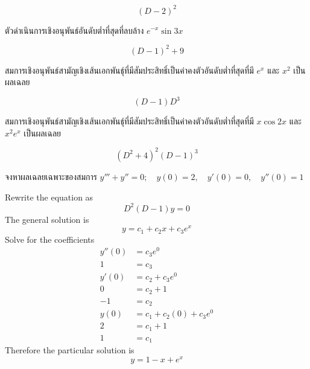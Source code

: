 \documentclass[12pt,final]{novelette} %
\begin{document}
\begin{question}[resume]
\begin{question}
        $$ \boxed{(D-2)^2} $$

        \item
        ตัวดําเนินการเชิงอนุพันธ์อันดับต่ำที่สุดที่ลบล้าง $e^{-x}\sin 3x$ 

        $$ \boxed{(D-1)^2 + 9} $$

        \item
        สมการเชิงอนุพันธ์สามัญเชิงเส้นเอกพันธุ์ที่มีสัมประสิทธิ์เป็นค่าคงตัวอันดับต่ำที่สุดที่มี $e^x$ และ $x^2$ เป็นผลเฉลย 

        $$ \boxed{(D-1)D^3} $$

        \pagebreak

        \item
        สมการเชิงอนุพันธ์สามัญเชิงเส้นเอกพันธุ์ที่มีสัมประสิทธิ์เป็นค่าคงตัวอันดับต่ำที่สุดที่มี $x \cos 2x$ และ $x^2 e^x$ เป็นผลเฉลย 

        $$ \boxed{(D^2 + 4)^2 (D-1)^3} $$
    \end{question}

    \item {}
    จงหาผลเฉลยเฉพาะของสมการ
    $y''' + y'' = 0; \quad y(0) = 2, \quad y'(0) = 0, \quad y''(0) = 1$ 

    \bigskip
    Rewrite the equation as
    $$ D^2(D - 1) y = 0 $$
    The general solution is
    $$ y = c_1 + c_2 x + c_3 e^x $$
    Solve for the coefficients
    \begin{align*}
        y''(0) & = c_3 e^0                 \\
        1      & = c_3                     \\
        y'(0)  & = c_2 + c_3 e^0           \\
        0      & = c_2 + 1                 \\
        -1     & = c_2                     \\
        y(0)   & = c_1 + c_2 (0) + c_3 e^0 \\
        2      & = c_1 + 1                 \\
        1      & = c_1
    \end{align*}
    Therefore the particular solution is
    $$ \boxed{y = 1 - x + e^x} $$
\end{question}
\end{document}
